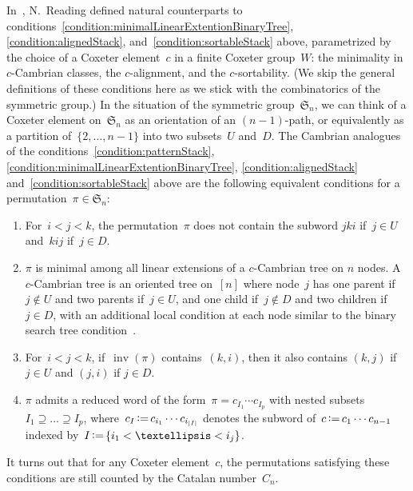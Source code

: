 \documentclass[11pt]{article}
\theoremstyle{definition}
\numberwithin{equation}{section}
\newcommand{\fS}{\mathfrak{S}}
\newcommand{\eqdef}{\mbox{\,\raisebox{0.2ex}{\scriptsize\ensuremath{\mathrm:}}\ensuremath{=}\,}}
\DeclareMathOperator{\inv}{inv}
\begin{document}
In~\cite{Reading-latticeCongruences, Reading-cambrianLattices, Reading-coxeterSortable}, N.~Reading defined natural counterparts to conditions~\ref{condition:minimalLinearExtentionBinaryTree}, \ref{condition:alignedStack}, and~\ref{condition:sortableStack} above, parametrized by the choice of a Coxeter element~$c$ in a finite Coxeter group~$W$: the minimality in $c$-Cambrian classes, the $c$-alignment, and the $c$-sortability.
(We skip the general definitions of these conditions here as we stick with the combinatorics of the symmetric group.)
In the situation of the symmetric group~$\fS_n$, we can think of a Coxeter element on~$\fS_n$ as an orientation of an $(n-1)$-path, or equivalently as a partition of~$\{2, \dots, n-1\}$ into two subsets~$U$ and~$D$.
The Cambrian analogues of the conditions~\ref{condition:patternStack}, \ref{condition:minimalLinearExtentionBinaryTree}, \ref{condition:alignedStack} and~\ref{condition:sortableStack} above are the following equivalent conditions for a permutation~$\pi \in \fS_n$:
\begin{enumerate}[(i')]
\addtocounter{enumi}{1}
\item \label{condition:patternCambrian}
For~$i < j < k$, the permutation~$\pi$ does not contain the subword $jki$ if~$j \in U$ and~$kij$ if~$j \in D$.
\item \label{condition:minimalLinearExtentionCambrian}
$\pi$ is minimal among all linear extensions of a $c$-Cambrian tree on $n$ nodes. A $c$-Cambrian tree is an oriented tree on~$[n]$ where node~$j$ has one parent if~$j \notin U$ and two parents if~$j \in U$, and one child if~$j \notin D$ and two children if~$j \in D$, with an additional local condition at each node similar to the binary search tree condition~\cite{ChatelPilaud}.
\item \label{condition:alignedCambrian}
For~$i < j < k$, if~$\inv(\pi)$ contains~$(k,i)$, then it also contains $(k,j)$ if~$j \in U$ and $(j,i)$ if $j \in D$.
\item \label{condition:sortableCambrian}
$\pi$ admits a reduced word of the form~$\pi = c_{I_1} \cdots c_{I_p}$ with nested subsets ${I_1 \supseteq \dots \supseteq I_p}$, where~$c_I \eqdef c_{i_1} \cdots c_{i_{|I|}}$ denotes the subword of~$c \eqdef c_1 \cdots c_{n-1}$ indexed by~$I \eqdef \{i_1 < \dots < i_j\}$.
\end{enumerate}
It turns out that for any Coxeter element~$c$, the permutations satisfying these conditions are still counted by the Catalan number~$C_n$.
\end{document}
